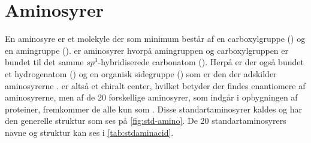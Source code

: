 \section{Aminosyrer}

En aminosyre er et molekyle der som minimum består af en carboxylgruppe () og en amingruppe ()\footnotemark{}.
 er aminosyrer hvorpå amingruppen og carboxylgruppen er bundet til det samme $sp^3$-hybridiserede carbonatom ().
Herpå er der også bundet et hydrogenatom () og en organisk sidegruppe () som er den der adskilder aminosyrerne \parencite{aminoBrit}.
 er altså et chiralt center,\footnotemark{} hvilket betyder der findes enantiomere af aminosyrerne, men af de 20 forskellige aminosyrer, som indgår i opbygningen af proteiner, fremkommer de alle kun som  \parencite{basisA}.
Disse standartaminosyrer kaldes  og har den generelle struktur som ses på \cref{fig:std-amino}.
De 20 standartaminosyrers navne og struktur kan ses i \cref{tab:stdaminacid}.

